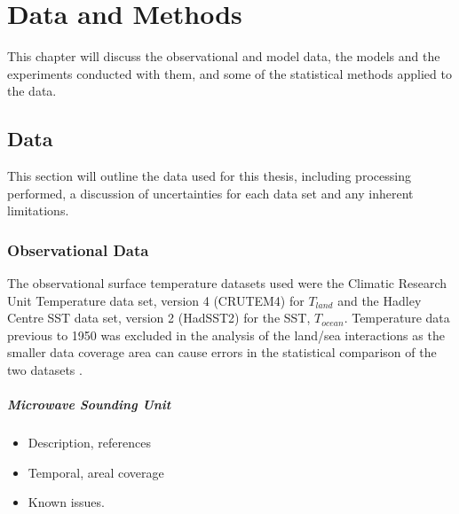 \chapter{Data and Methods} %

\label{methods} %


This chapter will discuss the observational and model data, the models and the 
experiments conducted with them, and some of the statistical methods applied to 
the data.


\section{Data}

This section will outline the data used for this thesis, including processing 
performed, a discussion of uncertainties for each data set and any inherent 
limitations.

\subsection{Observational Data}

The observational surface temperature datasets used were the Climatic Research 
Unit Temperature data set, version 4 (CRUTEM4) \citep{Brohan2006} for $T_{land}$ 
and the Hadley Centre SST data set, version 2 (HadSST2) \citep{Rayner2006}for 
the SST, $T_{ocean}$.  Temperature data previous to 1950 was excluded in the 
analysis of the land/sea interactions as the smaller data coverage area can 
cause errors in the statistical comparison of the two datasets 
\citep{Dommenget2009}.  

\paragraph{Microwave Sounding Unit}
\begin{itemize}
	\item Description, references
	\item Temporal, areal coverage
	\item Known issues.
\end{itemize}


